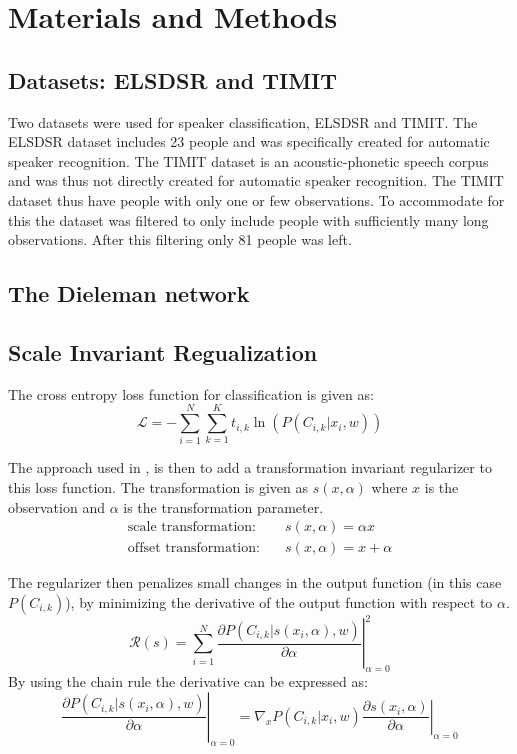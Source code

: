 \section{Materials and Methods}

\subsection{Datasets: ELSDSR and TIMIT}

Two datasets were used for speaker classification, ELSDSR and TIMIT. The ELSDSR dataset includes 23 people and was specifically created for automatic speaker recognition. The TIMIT dataset is an acoustic-phonetic speech corpus and was thus not directly created for automatic speaker recognition. The TIMIT dataset thus have people with only one or few observations. To accommodate for this the dataset was filtered to only include people with sufficiently many long observations. After this filtering only 81 people was left.

\subsection{The Dieleman network}


\subsection{Scale Invariant Regualization}

The cross entropy loss function for classification is given as:
\begin{equation}
\mathcal{L} = - \sum_{i=1}^N \sum_{k=1}^K t_{i,k} \ln(P(C_{i,k} | x_i, w))
\end{equation}

The approach used in \cite{scale-invariante}, is then to add a transformation invariant regularizer to this loss function. The transformation is given as $s(x, \alpha)$ where $x$ is the observation and $\alpha$ is the transformation parameter.
\begin{align}
\text{scale transformation:}&\quad s(x, \alpha) = \alpha x\\
\text{offset transformation:}&\quad s(x, \alpha) = x + \alpha
\end{align}

The regularizer then penalizes small changes in the output function (in this case $P(C_{i, k})$), by minimizing the derivative of the output function with respect to $\alpha$.
\begin{equation}
\mathcal{R}(s) = \sum_{i=1}^N \left. \frac{\partial P(C_{i, k} | s(x_i, \alpha), w)}{\partial \alpha} \right|^2_{\alpha=0}
\end{equation}
By using the chain rule the derivative can be expressed as:
\begin{equation*}
\left. \frac{\partial P(C_{i, k} | s(x_i, \alpha), w)}{\partial \alpha} \right|_{\alpha=0} = \left.\nabla_x P(C_{i, k} | x_i, w) \frac{\partial s(x_i, \alpha)}{\partial \alpha} \right|_{\alpha=0}
\end{equation*}

